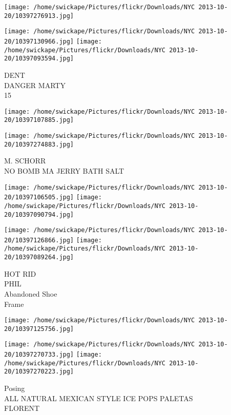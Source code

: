 \documentclass[10pt,letterpaper]{article}
\begin{document}
\texttt{[image: /home/swickape/Pictures/flickr/Downloads/NYC 2013-10-20/10397276913.jpg]}

\vspace{0.25in}
\texttt{[image: /home/swickape/Pictures/flickr/Downloads/NYC 2013-10-20/10397130966.jpg]}
\texttt{[image: /home/swickape/Pictures/flickr/Downloads/NYC 2013-10-20/10397093594.jpg]}

DENT\\
DANGER MARTY\\
15\\
\pagebreak

\texttt{[image: /home/swickape/Pictures/flickr/Downloads/NYC 2013-10-20/10397107885.jpg]}

\vspace{0.25in}
\texttt{[image: /home/swickape/Pictures/flickr/Downloads/NYC 2013-10-20/10397274883.jpg]}

M. SCHORR\\
NO BOMB MA JERRY BATH SALT\\
\pagebreak

\texttt{[image: /home/swickape/Pictures/flickr/Downloads/NYC 2013-10-20/10397106505.jpg]}
\texttt{[image: /home/swickape/Pictures/flickr/Downloads/NYC 2013-10-20/10397090794.jpg]}

\texttt{[image: /home/swickape/Pictures/flickr/Downloads/NYC 2013-10-20/10397126866.jpg]}
\texttt{[image: /home/swickape/Pictures/flickr/Downloads/NYC 2013-10-20/10397089264.jpg]}

HOT RID\\
PHIL\\
Abandoned Shoe\\
Frame\\
\pagebreak

\texttt{[image: /home/swickape/Pictures/flickr/Downloads/NYC 2013-10-20/10397125756.jpg]}

\vspace{0.25in}
\texttt{[image: /home/swickape/Pictures/flickr/Downloads/NYC 2013-10-20/10397270733.jpg]}
\texttt{[image: /home/swickape/Pictures/flickr/Downloads/NYC 2013-10-20/10397270223.jpg]}

Posing\\
ALL NATURAL MEXICAN STYLE ICE POPS PALETAS\\
FLORENT\\
\pagebreak
\end{document}

